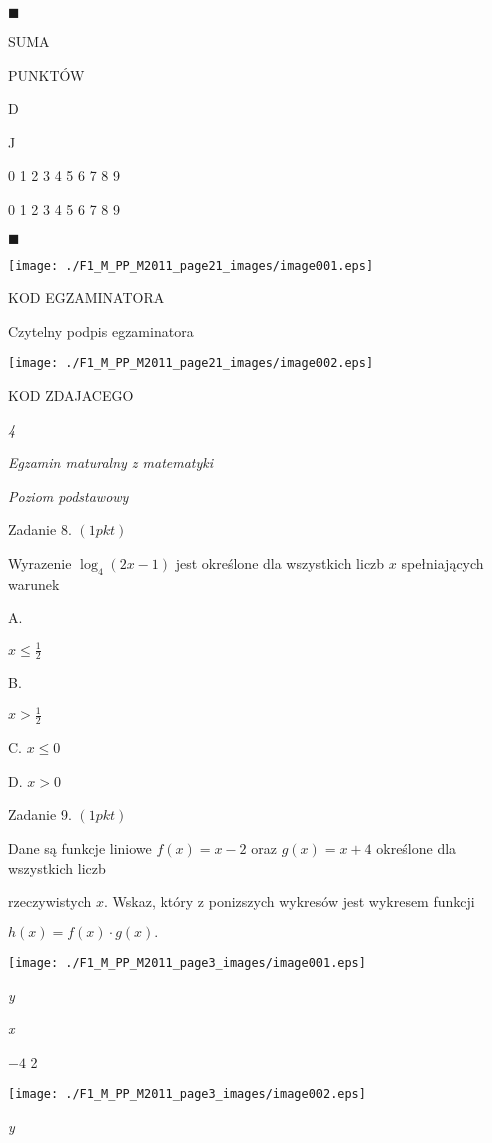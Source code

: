 \documentclass[a4paper,12pt]{article}
\begin{document}
$\blacksquare$

SUMA

PUNKTÓW

D \square  \square  \square  \square  \square  \square  \square  \square  \square  \square 

J

0 1 2 3 4 5 6 7 8 9

0 1 2 3 4 5 6 7 8 9

$\blacksquare$




\begin{center}
\texttt{[image: ./F1\_M\_PP\_M2011\_page21\_images/image001.eps]}
\end{center}
KOD EGZAMINATORA

Czytelny podpis egzaminatora
\begin{center}
\texttt{[image: ./F1\_M\_PP\_M2011\_page21\_images/image002.eps]}
\end{center}
KOD ZDAJACEGO





{\it 4}

{\it Egzamin maturalny z matematyki}

{\it Poziom podstawowy}

Zadanie 8. $(1pkt)$

Wyrazenie $\log_{4}(2x-1)$ jest określone dla wszystkich liczb $x$ spełniających warunek

A.

$x\displaystyle \leq\frac{1}{2}$

B.

$x>\displaystyle \frac{1}{2}$

C. $x\leq 0$

D. $x>0$

Zadanie 9. $(1pkt)$

Dane są funkcje liniowe $f(x)=x-2$ oraz $g(x)=x+4$ określone dla wszystkich liczb

rzeczywistych $x$. Wskaz, który z ponizszych wykresów jest wykresem funkcji

$h(x)=f(x)\cdot g(x).$
\begin{center}
\texttt{[image: ./F1\_M\_PP\_M2011\_page3\_images/image001.eps]}
\end{center}
{\it y}

{\it x}

$-4$  2
\begin{center}
\texttt{[image: ./F1\_M\_PP\_M2011\_page3\_images/image002.eps]}
\end{center}
{\it y}
\end{document}
